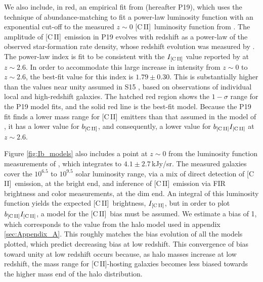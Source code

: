 \documentclass[fleqn,usenatbib]{mnras}
\newcommand{\cii}{[C{\sc\,II}]}
\begin{document}
We also include, in red, an empirical fit from \cite{2019MNRAS.488.3014P} (hereafter P19), which uses the technique of abundance-matching to fit a power-law luminosity function with an exponential cut-off to the measured $z {\sim} 0$ \cii\ luminosity function from \cite{2017ApJ...834...36H}. The amplitude of \cii\ emission in P19 evolves with redshift as a power-law of the observed star-formation rate density, whose redshift evolution was measured by \cite{Madau2014}. The power-law index is fit to be consistent with the $I_{\rm \cii}$ value reported by \cite{pullen2018search} at $z\sim2.6$. In order to accommodate this large increase in intensity from $z\sim 0$ to $z\sim2.6$, the best-fit value for this index is $1.79 \pm 0.30$. This is substantially higher than the values near unity assumed in S15 \citep{Silva2015}, based on observations of individual local and high-redshift galaxies. The hatched red region shows the $1-\sigma$ range for the P19 model fits, and the solid red line is the best-fit model. Because the P19 fit finds a lower mass range for \cii\ emitters than that assumed in the model of \cite{pullen2018search}, it has a lower value for $b_{\rm \cii}$, and consequently, a lower value for $b_{\rm \cii}I_{\rm \cii}$ at $z\sim2.6$.

Figure \ref{fig:Ib_models} also includes a point at $z {\sim} 0$ from the luminosity function measurements of \cite{2017ApJ...834...36H}, which integrates to $4.1\pm 2.7$\,kJy/sr. The measured galaxies cover the $10^{6.5}$ to $10^{9.5}$ solar luminosity range, via a mix of direct detection of \cii\ emission, at the bright end, and inference of \cii\ emission via FIR brightness and color measurements, at the dim end. An integral of this luminosity function yields the expected \cii\ brightness, $I_{\rm \cii}$, but in order to plot $b_{\rm \cii}I_{\rm \cii}$, a model for the \cii\ bias must be assumed. We estimate a bias of 1, which corresponds to the value from the halo model used in appendix \ref{sec:Appendix_A}. This roughly matches the bias evolution of all the models plotted, which predict decreasing bias at low redshift. This convergence of bias toward unity at low redshift occurs because, as halo masses increase at low redshift, the mass range for \cii-hosting galaxies becomes less biased towards the higher mass end of the halo distribution.
\end{document}
